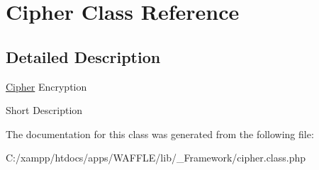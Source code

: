 \hypertarget{class_w_a_f_f_l_e_1_1_framework_1_1_encryption_1_1_cipher}{}\section{Cipher Class Reference}
\label{class_w_a_f_f_l_e_1_1_framework_1_1_encryption_1_1_cipher}


\subsection{Detailed Description}
\hyperlink{class_w_a_f_f_l_e_1_1_framework_1_1_encryption_1_1_cipher}{Cipher} Encryption

Short Description 

The documentation for this class was generated from the following file\+:\begin{DoxyCompactItemize}
\item 
C\+:/xampp/htdocs/apps/\+W\+A\+F\+F\+L\+E/lib/\+\_\+\+Framework/cipher.\+class.\+php\end{DoxyCompactItemize}
